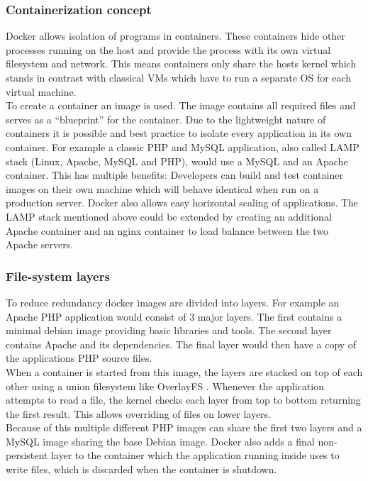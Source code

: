 \documentclass[conference,compsoc,final,a4paper]{IEEEtran}
\begin{document}
\subsubsection*{Containerization concept}
Docker allows isolation of programs in containers. These containers hide other processes running on the host and provide the process with its own virtual filesystem
and network. This means containers only share the hosts kernel which stands in contrast with classical VMs which have to run a separate OS for
each virtual machine. \cite{bernstein2014containers}\\
To create a container an image is used. The image contains all required files and serves as a \enquote{blueprint} for the container. \cite{bernstein2014containers}
Due to the lightweight nature of containers it is possible and best practice to isolate every application in its own container. \cite{dockerBestPractices} For example a
classic PHP and MySQL application, also called LAMP stack (Linux, Apache, MySQL and PHP), would use a MySQL and an Apache container. This has multiple benefits:
Developers can build and test container images on their own machine which will behave identical when run on a production server. Docker also allows easy horizontal
scaling of applications. The LAMP stack mentioned above could be extended by creating an additional Apache container and an nginx container
to load balance between the two Apache servers.
\subsubsection*{File-system layers}
To reduce redundancy docker images are divided into layers. \cite{dockerBestPractices} For example an Apache PHP application would consist of 3
major layers. The first contains a minimal debian image providing basic libraries and tools. The second layer contains Apache and its dependencies. The final
layer would then have a copy of the applications PHP source files. \\
When a container is started from this image, the layers are stacked on top of each other
using a union filesystem like OverlayFS \cite{overlayfs}. Whenever the application attempts to read a file, the kernel checks each layer from top to bottom
returning the first result. This allows overriding of files on lower layers. \\
Because of this multiple different PHP images can share the first two layers and a MySQL image
sharing the base Debian image. Docker also adds a final non-persistent layer to the container which the application running inside uses to write files,
which is discarded when the container is shutdown.
\end{document}
